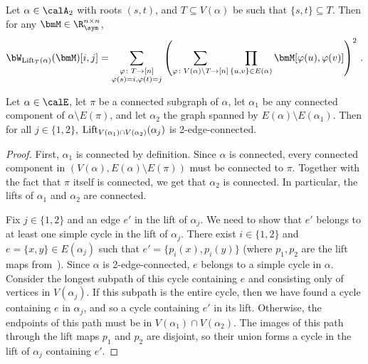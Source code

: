 \begin{claim}
    \label{claim:lift}
    Let $\alpha\in\calA_2$  with roots
    $(s,t)$, and $T\subseteq V(\alpha)$ be such that $\{s,t\}\subseteq T$. Then for any $\bmM\in \R_\sym^{n\times n}$,
    \[
        \bW_{\lift_T(\alpha)}(\bmM)[i,j] = \sum_{\substack{\varphi\colon T\to [n]\\\varphi(s)=i,\varphi(t)=j}} \left(\sum_{\varphi\colon V(\alpha)\setminus T\to [n]} \prod_{\{u,v\}\in E(\alpha)} \bmM[\varphi(u),\varphi(v)]\right)^2\,.
    \]
\end{claim}

\begin{lemma}
    \label{lem:structural-2ec}
    Let $\alpha\in\calE$, let $\pi$ be a connected
    subgraph of $\alpha$, let $\alpha_1$ be any connected component
    of $\alpha\setminus E(\pi)$, and let $\alpha_2$ the graph spanned by $E(\alpha)\setminus E(\alpha_1)$.
    Then for all $j\in \{1,2\}$, 
    $\textnormal{Lift}_{V(\alpha_1)\cap V(\alpha_2)}(\alpha_j)$ is 2-edge-connected.
\end{lemma}

\begin{proof}
    First, $\alpha_1$ is connected by definition. Since $\alpha$ is connected, every connected component
    in $(V(\alpha), E(\alpha)\setminus E(\pi))$ must be connected to
    $\pi$. Together with the fact
    that $\pi$ itself is connected,
    we get that $\alpha_2$ is connected. In particular, the lifts
    of $\alpha_1$ and $\alpha_2$ are connected.

    Fix $j\in \{1,2\}$ and an edge $e'$ in the lift of $\alpha_j$. We need to show that $e'$ belongs to at least one simple cycle in the lift of $\alpha_j$.
    There exist $i\in \{1,2\}$ and
    $e=\{x,y\}\in E(\alpha_j)$ such that $e' = \{p_i(x),p_i(y)\}$ (where $p_1,p_2$ are the lift maps from~). Since $\alpha$ is 2-edge-connected, $e$ belongs to a simple cycle
    in $\alpha$. Consider the
    longest subpath of this cycle
    containing $e$ and consisting 
    only of vertices in $V(\alpha_j)$.
    If this subpath is the entire cycle,
    then we have found a cycle containing $e$ in
    $\alpha_j$, and so a cycle containing $e'$ in its lift.
    Otherwise, the endpoints of this path
    must be in $V(\alpha_1)\cap V(\alpha_2)$.
    The images of this
    path through the lift maps
    $p_1$ and $p_2$ are
    disjoint, so their union forms a 
    cycle in the lift of $\alpha_j$ containing $e'$.
\end{proof}

